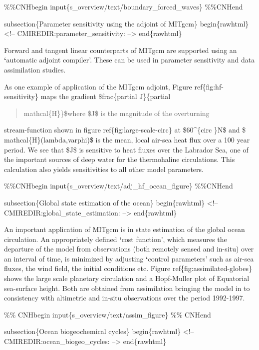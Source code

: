 \documentclass[letterpaper,10pt,english]{sphinxmanual}
\begin{document}
\%\%CNHbegin
input\{s\_overview/text/boundary\_forced\_waves\}
\%\%CNHend

subsection\{Parameter sensitivity using the adjoint of MITgcm\}
begin\{rawhtml\}
\textless{}!-- CMIREDIR:parameter\_sensitivity: --\textgreater{}
end\{rawhtml\}

Forward and tangent linear counterparts of MITgcm are supported using an
{\color{red}\bfseries{}{}`}automatic adjoint compiler'. These can be used in parameter sensitivity and
data assimilation studies.

As one example of application of the MITgcm adjoint, Figure
ref\{fig:hf-sensitivity\} maps the gradient \$frac\{partial J\}\{partial
\begin{quote}

mathcal\{H\}\}\$where \$J\$ is the magnitude of the overturning
\end{quote}

stream-function shown in figure ref\{fig:large-scale-circ\} at
\$60\textasciicircum{}\{circ \}N\$ and \$ mathcal\{H\}(lambda,varphi)\$ is the mean, local
air-sea heat flux over a 100 year period. We see that \$J\$ is sensitive
to heat fluxes over the Labrador Sea, one of the important sources of
deep water for the thermohaline circulations. This calculation also
yields sensitivities to all other model parameters.

\%\%CNHbegin
input\{s\_overview/text/adj\_hf\_ocean\_figure\}
\%\%CNHend

subsection\{Global state estimation of the ocean\}
begin\{rawhtml\}
\textless{}!-- CMIREDIR:global\_state\_estimation: --\textgreater{}
end\{rawhtml\}

An important application of MITgcm is in state estimation of the global
ocean circulation. An appropriately defined {\color{red}\bfseries{}{}`}cost function', which measures
the departure of the model from observations (both remotely sensed and
in-situ) over an interval of time, is minimized by adjusting {\color{red}\bfseries{}{}`}control
parameters' such as air-sea fluxes, the wind field, the initial conditions
etc. Figure ref\{fig:assimilated-globes\} shows the large scale planetary
circulation and a Hopf-Muller plot of Equatorial sea-surface height.
Both are obtained from assimilation bringing the model in to
consistency with altimetric and in-situ observations over the period
1992-1997.

\%\% CNHbegin
input\{s\_overview/text/assim\_figure\}
\%\% CNHend

subsection\{Ocean biogeochemical cycles\}
begin\{rawhtml\}
\textless{}!-- CMIREDIR:ocean\_biogeo\_cycles: --\textgreater{}
end\{rawhtml\}
\end{document}
